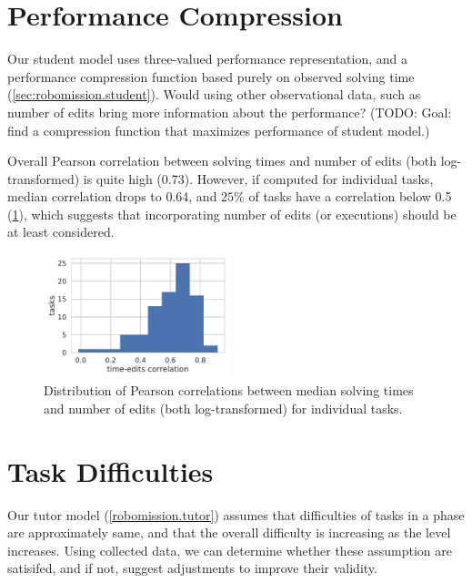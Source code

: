 \section{Performance Compression}

Our student model uses three-valued performance representation, and
a performance compression function based purely on observed solving time
(\cref{sec:robomission.student}).
Would using other observational data, such as number of edits
bring more information about the performance?
(TODO: Goal: find a compression function that maximizes performance of
student model.)

Overall Pearson correlation between solving times and number of edits (both
log-transformed) is quite high (0.73). However, if computed for individual tasks,
median correlation drops to 0.64, %
and $25\%$ of tasks have a correlation below 0.5 %
(\cref{fig:time-vs-edits}), which suggests that incorporating number of edits
(or executions) should be at least considered.


\begin{figure}[htb]
\centering
\includegraphics[width=0.48\textwidth]{img/time-edits-corr}
\caption{%
  Distribution of Pearson correlations between median solving times and number
  of edits (both log-transformed) for individual tasks.} %
\label{fig:time-vs-edits}
\end{figure}


\section{Task Difficulties}

Our tutor model (\cref{robomission.tutor}) assumes that difficulties of tasks
in a phase are approximately same,
and that the overall difficulty is increasing as the level increases.   %
Using collected data, we can determine whether these assumption are satisifed,
and if not, suggest adjustments to improve their validity.

